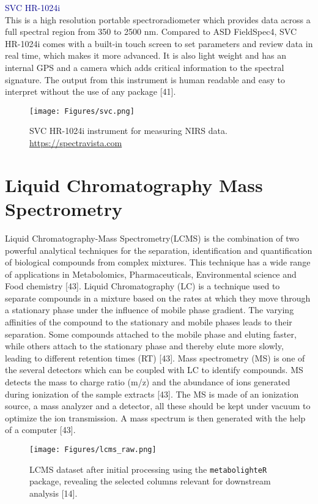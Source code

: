 \documentclass[12pt,a4paper]{report}
\begin{document}
\textcolor{darkblue}{SVC HR-1024i}\\
This is a high resolution portable spectroradiometer which provides data across a full spectral region from 350 to 2500 nm. Compared to ASD FieldSpec4, SVC HR-1024i comes with a built-in touch screen to set parameters and review data in real time, which makes it more advanced. It is also light weight and has an internal GPS and a camera which adds critical information to the spectral signature. The output from this instrument is human readable and easy to interpret without the use of any package [41].

\begin{figure}[h]
    \centering
    \texttt{[image: Figures/svc.png]} 
    \caption{SVC HR-1024i instrument for measuring NIRS data.\\
    \url{https://spectravista.com}}
    \label{fig:svc}
\end{figure}

\section{Liquid Chromatography Mass Spectrometry}
Liquid Chromatography-Mass Spectrometry(LCMS) is the combination of two powerful analytical techniques for the separation, identification and quantification of biological compounds from complex mixtures. This technique has a wide range of applications in Metabolomics, Pharmaceuticals, Environmental science and Food chemistry [43]. Liquid Chromatography (LC) 
is a technique used to separate compounds in a mixture based on the rates at which they move through a stationary phase under the influence of mobile phase gradient. The varying affinities of the compound to the stationary and mobile phases leads to their separation. Some compounds attached to the mobile phase and eluting faster, while others attach to 
the stationary phase and thereby elute more slowly, leading to different retention times (RT) [43]. Mass spectrometry (MS) is one of the several detectors which can be coupled with LC to identify compounds. MS detects the mass to charge ratio (m/z) and the abundance of ions generated during ionization of the sample extracts [43]. The MS is made of an ionization source, a mass analyzer and a detector, all these should be kept under vacuum to optimize the ion transmission. A mass spectrum is then generated with the help of a computer [43]. \\

\begin{figure}[h]
    \centering
    \texttt{[image: Figures/lcms\_raw.png]} 
    \caption{LCMS dataset after initial processing using the \texttt{metabolighteR} package, revealing the selected columns relevant for downstream analysis [14].}
    \label{fig:lcms_raw}
\end{figure}
\end{document}
